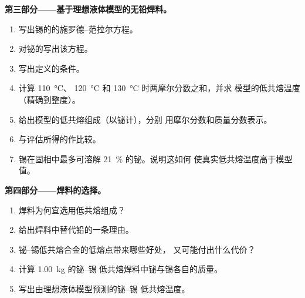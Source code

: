 \begin{problem}
\medskip
\noindent\textbf{第三部分——基于理想液体模型的无铅焊料。}
\begin{enumerate}[resume]
  \item 写出锡的的施罗德–范拉尔方程。
  \item 对铋的写出该方程。
  \item 写出定义的条件。
  \item 计算 \qty{110}{\degreeCelsius}、
        \qty{120}{\degreeCelsius} 和 \qty{130}{\degreeCelsius} 时两摩尔分数之和，并求
        模型的低共熔温度（精确到整度）。
  \item 给出模型的低共熔组成（以铋计），分别
        用摩尔分数和质量分数表示。
  \item 与评估所得的作比较。
  \item 锡在固相中最多可溶解 21~\% 的铋。说明这如何
        使真实低共熔温度高于模型值。
\end{enumerate}

\medskip
\noindent\textbf{第四部分——焊料的选择。}
\begin{enumerate}[resume]
  \item 焊料为何宜选用低共熔组成？
  \item 给出焊料中替代铅的一条理由。
  \item 铋–锡低共熔合金的低熔点带来哪些好处，
        又可能付出什么代价？
  \item 计算 \qty{1.00}{kg} 的铋–锡
        低共熔焊料中铋与锡各自的质量。
  \item 写出由理想液体模型预测的铋–锡
        低共熔温度。
\end{enumerate}
\end{problem}
